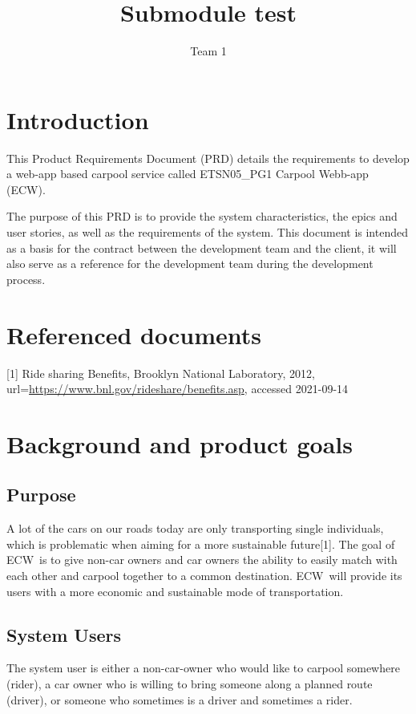 \documentclass{article}
\title{Submodule test}
\author{Team 1}
\newcommand{\name}{ECW\ }
\newcommand{\nameNospace}{ECW}
\begin{document}
\date{}
\maketitle
\thispagestyle{fancy}
\newpage

\tableofcontents
\newpage

\section{Introduction}
This Product Requirements Document (PRD) details the requirements to develop a web-app based carpool service called ETSN05\_PG1 Carpool Webb-app (\nameNospace).

The purpose of this PRD is to provide the system characteristics, the epics and user stories, as well as the requirements of the system. This document is intended as a basis for the contract between the development team and the client, it will also serve as a reference for the development team during the development process.

\section{Referenced documents}
[1] Ride sharing Benefits, Brooklyn National Laboratory, 2012, url=\url{https://www.bnl.gov/rideshare/benefits.asp}, accessed 2021-09-14

\section{Background and product goals}
\subsection{Purpose}
A lot of the cars on our roads today are only transporting single individuals, which is problematic when aiming for a more sustainable future[1]. The goal of \name is to give non-car owners and car owners the ability to easily match with each other and carpool together to a common destination. \name will provide its users with a more economic and sustainable mode of transportation.

\subsection{System Users}
The system user is either a non-car-owner who would like to carpool somewhere (rider), a car owner who is willing to bring someone along a planned route (driver), or someone who sometimes is a driver and sometimes a rider.
\end{document}
